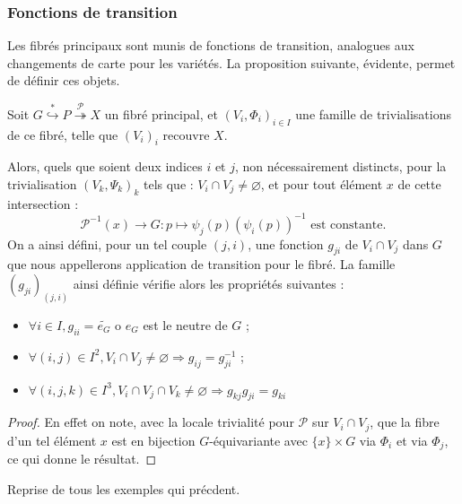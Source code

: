 \subsubsection{Fonctions de transition}

Les fibr\'es principaux sont munis de fonctions de transition, analogues aux changements de carte pour les variétés. La proposition suivante, évidente, permet de définir ces objets.

\begin{prefi}\label{ftr}
Soit $G \overset{\ast}{\hookrightarrow} P \overset{\mathcal{P}}{\twoheadrightarrow} X$ un fibr\'e principal, %
et $(V_i,\Phi_i)_{i \in I}$ une famille de trivialisations de ce fibré, telle que $(V_i)_i$ recouvre $X$.
\par
Alors, quels que soient deux indices $i$ et $j$, non nécessairement distincts, pour la trivialisation $(V_k,\Psi_k)_k$ tels que : $V_i \cap V_j \neq \varnothing$, %
et pour tout élément $x$ de cette intersection :
\[\mathcal{P}^{-1}(x) \rightarrow G : p \mapsto \psi_j(p) (\psi_i (p))^{-1}\text{ est constante.}\]
On a ainsi d\'efini, pour un tel couple $(j,i)$, une fonction $g_{ji}$ de $V_i \cap V_j$ dans $G$ que nous appellerons application de transition pour le fibré. %
La famille $(g_{ji})_{(j,i)}$ ainsi définie vérifie alors les propriétés suivantes :
\begin{itemize}
\item $\forall i \in I , g_{ii} = \tilde{e_G}$ o $e_G$ est le neutre de $G$ ;
\item $\forall (i,j) \in I^2 , V_i \cap V_j \neq \varnothing \Rightarrow g_{ij} = g_{ji}^{-1}$ ;
\item[Propri\'et\'e de cocycle :] $\forall (i,j,k) \in I^3 , V_i \cap V_j \cap V_k \neq \varnothing \Rightarrow g_{kj}g_{ji} = g_{ki}$
\end{itemize}
\end{prefi}

\begin{proof}
En effet on note, avec la locale trivialité pour $\mathcal{P}$ sur $V_i \cap V_j$, que la fibre d'un tel élément $x$ est en bijection $G$-équivariante avec $%
\{x\} \times G$ via $\Phi_i$ et via $\Phi_j$, ce qui donne le résultat.
\end{proof}

Reprise de tous les exemples qui pr\'ecdent.

